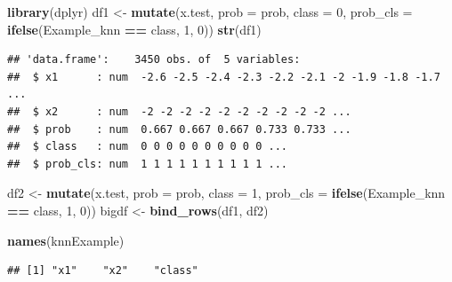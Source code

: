 \documentclass[]{article}
\newenvironment{Shaded}{\begin{snugshade}}{\end{snugshade}}
\newcommand{\KeywordTok}[1]{\textcolor[rgb]{0.13,0.29,0.53}{\textbf{#1}}}
\newcommand{\DataTypeTok}[1]{\textcolor[rgb]{0.13,0.29,0.53}{#1}}
\newcommand{\DecValTok}[1]{\textcolor[rgb]{0.00,0.00,0.81}{#1}}
\newcommand{\StringTok}[1]{\textcolor[rgb]{0.31,0.60,0.02}{#1}}
\newcommand{\OperatorTok}[1]{\textcolor[rgb]{0.81,0.36,0.00}{\textbf{#1}}}
\newcommand{\NormalTok}[1]{#1}
\begin{document}
\begin{Shaded}
\begin{Highlighting}[]
\KeywordTok{library}\NormalTok{(dplyr)}
\NormalTok{df1 <-}\StringTok{ }\KeywordTok{mutate}\NormalTok{(x.test, }\DataTypeTok{prob =}\NormalTok{ prob, }\DataTypeTok{class =} \DecValTok{0}\NormalTok{, }\DataTypeTok{prob_cls =} \KeywordTok{ifelse}\NormalTok{(Example_knn }\OperatorTok{==}\StringTok{ }\NormalTok{class, }\DecValTok{1}\NormalTok{, }\DecValTok{0}\NormalTok{))}
\KeywordTok{str}\NormalTok{(df1)}
\end{Highlighting}
\end{Shaded}

\begin{verbatim}
## 'data.frame':    3450 obs. of  5 variables:
##  $ x1      : num  -2.6 -2.5 -2.4 -2.3 -2.2 -2.1 -2 -1.9 -1.8 -1.7 ...
##  $ x2      : num  -2 -2 -2 -2 -2 -2 -2 -2 -2 -2 ...
##  $ prob    : num  0.667 0.667 0.667 0.733 0.733 ...
##  $ class   : num  0 0 0 0 0 0 0 0 0 0 ...
##  $ prob_cls: num  1 1 1 1 1 1 1 1 1 1 ...
\end{verbatim}

\begin{Shaded}
\begin{Highlighting}[]
\NormalTok{df2 <-}\StringTok{ }\KeywordTok{mutate}\NormalTok{(x.test, }\DataTypeTok{prob =}\NormalTok{ prob, }\DataTypeTok{class =} \DecValTok{1}\NormalTok{, }\DataTypeTok{prob_cls =} \KeywordTok{ifelse}\NormalTok{(Example_knn }\OperatorTok{==}\StringTok{ }\NormalTok{class, }\DecValTok{1}\NormalTok{, }\DecValTok{0}\NormalTok{))}
\NormalTok{bigdf <-}\StringTok{ }\KeywordTok{bind_rows}\NormalTok{(df1, df2)}

\KeywordTok{names}\NormalTok{(knnExample)}
\end{Highlighting}
\end{Shaded}

\begin{verbatim}
## [1] "x1"    "x2"    "class"
\end{verbatim}
\end{document}
